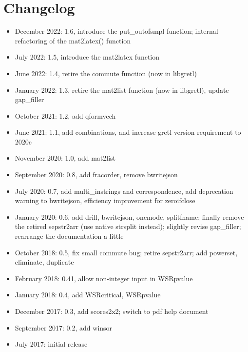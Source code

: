 \documentclass[11pt,english]{article}
\begin{document}
\section{Changelog }
\begin{itemize}
\item December 2022: 1.6, introduce the put\_outofsmpl function; internal
  refactoring of the mat2latex() function
\item July 2022: 1.5, introduce the mat2latex function
\item June 2022: 1.4, retire the commute function (now in libgretl)
\item January 2022: 1.3, retire the mat2list function (now in
  libgretl), update gap\_filler
\item October 2021: 1.2, add qformvech
\item June 2021: 1.1, add combinations, and increase gretl version requirement to 2020c
\item November 2020: 1.0, add mat2list
\item September 2020: 0.8, add fracorder, remove bwritejson
\item July 2020: 0.7, add multi\_instrings and correspondence, add deprecation warning to
bwritejson, efficiency improvement for zeroifclose
\item January 2020: 0.6, add drill, bwritejson, onemode, splitfname;
  finally remove the retired sepstr2arr (use native strsplit instead);
  slightly revise gap\_filler; rearrange the documentation a little
\item October 2018: 0.5, fix small commute bug; retire sepstr2arr; add powerset,
  eliminate, duplicate
\item February 2018: 0.41, allow non-integer input in WSRpvalue
\item January 2018: 0.4, add WSRcritical, WSRpvalue
\item December 2017: 0.3, add scores2x2; switch to pdf help document
\item September 2017: 0.2, add winsor
\item July 2017: initial release
\end{itemize}
\end{document}
